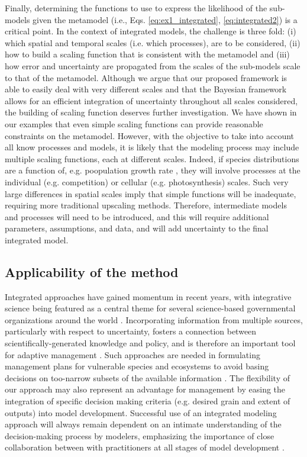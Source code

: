Finally, determining the functions to use to express the likelihood of the sub-models given the metamodel (i.e., Eqs. \ref{eq:ex1_integrated}, \ref{eq:integrated2}) is a critical point.
In the context of integrated models, the challenge is three fold: (i) which spatial and temporal scales (i.e. which processes), are to be considered, (ii) how to build a scaling function that is consistent with the metamodel and (iii) how error and uncertainty are propagated from the scales of the sub-models scale to that of the metamodel. 
Although we argue that our proposed framework is able to easily deal with very different scales and that the Bayesian framework allows for an efficient integration of uncertainty throughout all scales considered, the building of scaling function deserves further investigation. 
We have shown in our examples that even simple scaling functions can provide reasonable constraints on the metamodel. 
However, with the objective to take into account all know processes and models, it is likely that the modeling process may include multiple scaling functions, each at different scales. 
Indeed, if species distributions are a function of, e.g. poopulation growth rate \citep{Sykes1996, Guisan2000}, they will involve processes at the individual (e.g. competition) or cellular (e.g. photosynthesis) scales. 
Such very large differences in spatial scales imply that simple functions will be inadequate, requiring more traditional upscaling methods. 
Therefore, intermediate models and processes will need to be introduced, and this will require additional parameters, assumptions, and data, and will add uncertainty to the final integrated model.



\subsection*{Applicability of the method}
Integrated approaches have gained momentum in recent years, with integrative science being featured as a central theme for several science-based governmental organizations around the world \citep[e.g.][]{Bernier2013}. 
Incorporating information from multiple sources, particularly with respect to uncertainty,  fosters a connection between scientifically-generated knowledge and policy, and is therefore an important tool for adaptive management \citep[][Fig. \ref{fig:management}; ]{Rehme2011}.
Such approaches are needed in formulating management plans for vulnerable species and ecosystems to avoid basing decisions on too-narrow subsets of the available information \citep{Dawson2011}.
The flexibility of our approach may also represent an advantage for management by easing the integration of specific decision making criteria (e.g. desired grain and extent of outputs) into model development. 
Successful use of an integrated modeling approach will always remain dependent on an intimate understanding of the decision-making process by modelers, emphasizing the importance of close collaboration between with practitioners at all stages of model development \citep{Guisan2013}.

